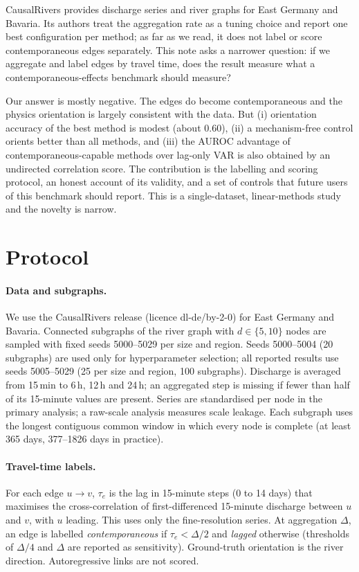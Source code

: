 \documentclass[10pt,a4paper]{article}
\newcommand{\tauE}{\tau_e}
\begin{document}
CausalRivers \citep{stein2025causalrivers} provides discharge series and river graphs for East Germany and Bavaria. Its authors treat the aggregation rate as a tuning choice and report one best configuration per method; as far as we read, it does not label or score contemporaneous edges separately. This note asks a narrower question: if we aggregate and label edges by travel time, does the result measure what a contemporaneous-effects benchmark should measure?

Our answer is mostly negative. The edges do become contemporaneous and the physics orientation is largely consistent with the data. But (i) orientation accuracy of the best method is modest (about 0.60), (ii) a mechanism-free control orients better than all methods, and (iii) the AUROC advantage of contemporaneous-capable methods over lag-only VAR is also obtained by an undirected correlation score. The contribution is the labelling and scoring protocol, an honest account of its validity, and a set of controls that future users of this benchmark should report. This is a single-dataset, linear-methods study and the novelty is narrow.

\section{Protocol}
\paragraph{Data and subgraphs.}
We use the CausalRivers release (licence dl-de/by-2-0) for East Germany and Bavaria. Connected subgraphs of the river graph with $d\in\{5,10\}$ nodes are sampled with fixed seeds 5000--5029 per size and region. Seeds 5000--5004 (20 subgraphs) are used only for hyperparameter selection; all reported results use seeds 5005--5029 (25 per size and region, 100 subgraphs). Discharge is averaged from 15\,min to 6\,h, 12\,h and 24\,h; an aggregated step is missing if fewer than half of its 15-minute values are present. Series are standardised per node in the primary analysis; a raw-scale analysis measures scale leakage. Each subgraph uses the longest contiguous common window in which every node is complete (at least 365 days, 377--1826 days in practice).

\paragraph{Travel-time labels.}
For each edge $u\to v$, $\tauE$ is the lag in 15-minute steps (0 to 14 days) that maximises the cross-correlation of first-differenced 15-minute discharge between $u$ and $v$, with $u$ leading. This uses only the fine-resolution series. At aggregation $\Delta$, an edge is labelled \emph{contemporaneous} if $\tauE<\Delta/2$ and \emph{lagged} otherwise (thresholds of $\Delta/4$ and $\Delta$ are reported as sensitivity). Ground-truth orientation is the river direction. Autoregressive links are not scored.
\end{document}
